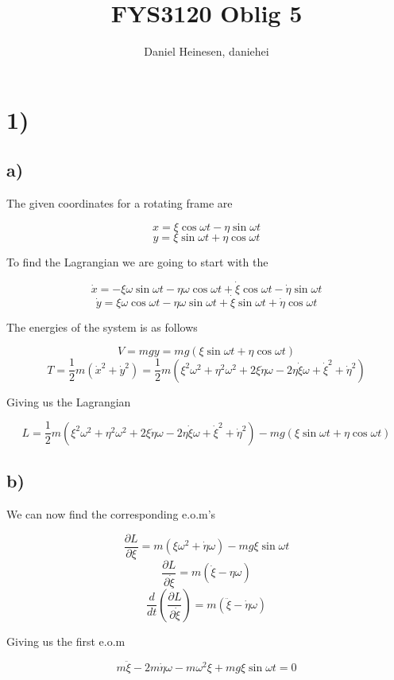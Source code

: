 \documentclass[a4paper,norsk, 10pt]{article}
\title{FYS3120 Oblig 5}
\author{Daniel Heinesen, daniehei}
\begin{document}
\maketitle
\section*{1)}
\subsection*{a)}
The given coordinates for a rotating frame are 

$$
x = \xi\cos\omega t - \eta\sin\omega t
$$
$$
y = \xi\sin\omega t + \eta\cos\omega t
$$

To find the Lagrangian we are going to start with the

$$
\dot{x} = -\xi\omega\sin\omega t - \eta\omega\cos\omega t + \dot{\xi}\cos\omega t - \dot{\eta}\sin\omega t
$$
$$
\dot{y} = \xi\omega\cos\omega t - \eta\omega\sin\omega t + \dot{\xi}\sin\omega t + \dot{\eta}\cos\omega t
$$

The energies of the system is as follows

$$
V = mgy = mg(\xi\sin\omega t + \eta\cos\omega t)
$$
$$
T = \frac{1}{2}m(\dot{x}^2 + \dot{y}^2) = \frac{1}{2}m(\xi^2\omega^2 + \eta^2\omega^2 + 2\xi\dot{\eta}\omega - 2\eta\dot{\xi}\omega + \dot{\xi}^2 + \dot{\eta}^2)
$$

Giving us the Lagrangian

$$
L = \frac{1}{2}m(\xi^2\omega^2 + \eta^2\omega^2 + 2\xi\dot{\eta}\omega - 2\eta\dot{\xi}\omega + \dot{\xi}^2 + \dot{\eta}^2)- mg(\xi\sin\omega t + \eta\cos\omega t)
$$

\subsection*{b)}
We can now find the corresponding e.o.m's

$$
\frac{\partial L}{\partial \xi} = m(\xi \omega^2 + \dot{\eta}\omega) - mg\xi\sin\omega t
$$
$$
\frac{\partial L}{\partial \dot{\xi}} = m(\dot{\xi} - \eta\omega)
$$
$$
\frac{d}{dt}\left(\frac{\partial L}{\partial \dot{\xi}}\right) = m(\ddot{\xi} - \dot{\eta}\omega)
$$

Giving us the first e.o.m

\begin{equation}
m\ddot{\xi} - 2m\dot{\eta}\omega - m\omega^2\xi+ mg\xi\sin\omega t = 0
\label{eq:xieom}
\end{equation}
\end{document}
